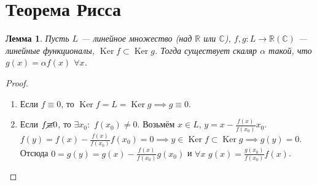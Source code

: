 \documentclass[11pt,openany,a4paper]{scrartcl}
\theoremstyle{plain}
\newtheorem{lemma}[theorem]{Лемма}
\theoremstyle{definition}
\newcommand\mb{\mathbb}
\newcommand\real{\mb R}
\newcommand{\complex}{\mb C}
\DeclareMathOperator{\Ker}{Ker}
\begin{document}
\section{Теорема Рисса}

\begin{lemma}
    Пусть $L$ — линейное множество (над $\real$ или $\complex$),
    $f, g: L \to \real(\complex)$ — линейные функционалы, $\Ker f \subset \Ker g$.
    Тогда существует скаляр $\alpha$ такой, что $g(x) = \alpha f(x)$ $\forall x$.
\end{lemma}
\begin{proof}
\mbox{}
    \begin{enumerate}
        \item Если $f\equiv 0$, то $\Ker f = L = \Ker g \implies g \equiv 0$.
        \item Если $f\cancel \equiv 0$, то $\exists x_0:$ $f(x_0) \neq 0$.
        Возьмём $x\in L$, $y = x - \frac{f(x)}{f(x_0)}x_0$.
        $f(y) = f(x) - \frac{f(x)}{f(x_0)}f(x_0) = 0 \implies
        y \in \Ker f\subset \Ker g \implies g(y) = 0$. Отсюда
        $0 = g(y) = g(x) - \frac{f(x)}{f(x_0)}g(x_0)$ и $\forall x$
        $g(x) = \frac{g(x_0)}{f(x_0)}f(x)$.
    \end{enumerate}
\end{proof}
\end{document}
